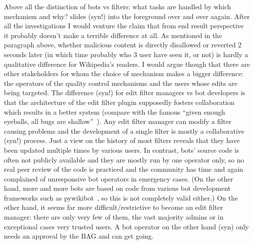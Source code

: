 Above all the distinction of bots vs filters: what tasks are handled by which mechanism and why? slides (syn!) into the foreground over and over aagain.
After all the investigations I would venture the claim that from end result perspective it probably doesn't make a terrible difference at all.
As mentioned in the paragraph above, whether malicious content is directly disallowed or reverted 2 seconds later (in which time probably who 3 user have seen it, or not) is hardly a qualitative difference for Wikipedia's readers. %
I would argue though that there are other stakeholders for whom the choice of mechanism makes a bigger difference:
the operators of the quality control mechanisms and the users whose edits are being targeted.
The difference (syn!) for edit filter managers vs bot developers is that the architecture of the edit filter plugin supposedly fosters collaboration which results in a better system (compare with the famous ``given enough eyeballs, all bugs are shallow''~\cite{Raymond1999}).
Any edit filter manager can modify a filter causing problems and the development of a single filter is mostly a collaborative (syn!) process.
Just a view on the history of most filters reveals that they have been updated multiple times by various users.
In contrast, bots' source code is often not publicly available and they are mostly run by one operator only, so no real peer review of the code is practiced and the community has time and again complained of unresponsive bot operators in emergency cases.
(On the other hand, more and more bots are based on code from various bot development frameworks such as pywikibot~\cite{pywikibot}, so this is not completely valid either.)
On the other hand, it seems far more difficult/restrictive to become an edit filter manager: there are only very few of them, the vast majority admins or in exceptional cases very trusted users.
A bot operator on the other hand (syn) only needs an approval by the BAG and can get going.

